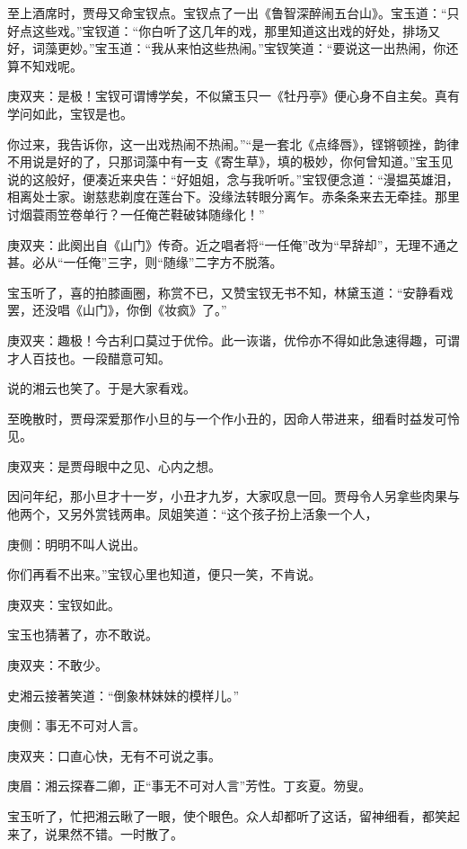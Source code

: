 \begin{parag}
    至上酒席时，贾母又命宝钗点。宝钗点了一出《鲁智深醉闹五台山》。宝玉道：“只好点这些戏。”宝钗道：“你白听了这几年的戏，那里知道这出戏的好处，排场又好，词藻更妙。”宝玉道：“我从来怕这些热闹。”宝钗笑道：“要说这一出热闹，你还算不知戏呢。\begin{note}庚双夹：是极！宝钗可谓博学矣，不似黛玉只一《牡丹亭》便心身不自主矣。真有学问如此，宝钗是也。\end{note}你过来，我告诉你，这一出戏热闹不热闹。”“是一套北《点绛唇》，铿锵顿挫，韵律不用说是好的了，只那词藻中有一支《寄生草》，填的极妙，你何曾知道。”宝玉见说的这般好，便凑近来央告：“好姐姐，念与我听听。”宝钗便念道：“漫揾英雄泪，相离处士家。谢慈悲剃度在莲台下。没缘法转眼分离乍。赤条条来去无牵挂。那里讨烟蓑雨笠卷单行？一任俺芒鞋破钵随缘化！”\begin{note}庚双夹：此阕出自《山门》传奇。近之唱者将“一任俺”改为“早辞却”，无理不通之甚。必从“一任俺”三字，则“随缘”二字方不脱落。\end{note}
\end{parag}


\begin{parag}
    宝玉听了，喜的拍膝画圈，称赏不已，又赞宝钗无书不知，林黛玉道：“安静看戏罢，还没唱《山门》，你倒《妆疯》了。”\begin{note}庚双夹：趣极！今古利口莫过于优伶。此一诙谐，优伶亦不得如此急速得趣，可谓才人百技也。一段醋意可知。\end{note}说的湘云也笑了。于是大家看戏。
\end{parag}


\begin{parag}
    至晚散时，贾母深爱那作小旦的与一个作小丑的，因命人带进来，细看时益发可怜见。\begin{note}庚双夹：是贾母眼中之见、心内之想。\end{note}因问年纪，那小旦才十一岁，小丑才九岁，大家叹息一回。贾母令人另拿些肉果与他两个，又另外赏钱两串。凤姐笑道：“这个孩子扮上活象一个人，\begin{note}庚侧：明明不叫人说出。\end{note}你们再看不出来。”宝钗心里也知道，便只一笑，不肯说。\begin{note}庚双夹：宝钗如此。\end{note}宝玉也猜著了，亦不敢说。\begin{note}庚双夹：不敢少。\end{note}史湘云接著笑道：“倒象林妹妹的模样儿。”\begin{note}庚侧：事无不可对人言。\end{note}\begin{note}庚双夹：口直心快，无有不可说之事。\end{note}\begin{note}庚眉：湘云探春二卿，正“事无不可对人言”芳性。丁亥夏。笏叟。\end{note}宝玉听了，忙把湘云瞅了一眼，使个眼色。众人却都听了这话，留神细看，都笑起来了，说果然不错。一时散了。
\end{parag}


